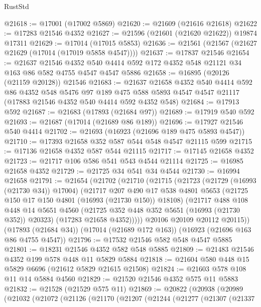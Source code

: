 \begin{lexlean}{RustStd}
\begin{coremodule}
@21618 := @17001 (@17002 @5869)
@21620 := @21609 (@21616 @21618)
@21622 := @17283 @21546 @4352
@21627 := @21596 (@21601 (@21620 @21622)) @19874 @17311
@21629 := @17014 (@17015 @5853)
@21636 := @21561 (@21567 (@21627 @21629 (@17014 (@17019 @5858 @4547))))
@21637 := @17837 @21546
@21654 := @21637
    @21546
    @4352
    @540
    @4414
    @592
    @172
    @4352
    @548
    @21121
    @34
    @163
    @86
    @582
    @4755
    @4547
    @4547
    @5886
@21658 := @16895 (@20126 (@21159 @20128)) @21546
@21683 := @21637
    @21658
    @4352
    @540
    @4414
    @592
    @86
    @4352
    @548
    @5476
    @97
    @189
    @475
    @588
    @5893
    @4547
    @4547
    @21117
    (@17883 @21546 @4352 @540 @4414 @592 @4352 @548)
@21684 := @17913 @592
@21687 := @21683 (@17893 (@21684 @97))
@21689 := @17919 @540 @592
@21693 := @21687 (@17014 (@21689 @86 @189))
@21696 := @17927 @21546 @540 @4414
@21702 := @21693 (@16923 (@21696 @189 @475 @5893 @4547))
@21710 := @17393 @21658 @352 @587 @544 @548 @4547 @21115 @599
@21715 := @17136 @21658 @4352 @587 @544 @21115
@21717 := @17145 @21658 @4352
@21723 := @21717 @106 @586 @541 @543 @4544 @21114
@21725 := @16985 @21658 @4352
@21729 := @21725 @34 @541 @34 @4544
@21730 := @16994 @21658
@21791 := @21654
    (@21702
      (@21710
        (@21715
          (@21723
            (@21729 (@16993 (@21730 @34)) @17004)
            (@21717
              @207
              @490
              @17
              @538
              @4801
              @5653
              (@21725 @150 @17 @150 @4801 (@16993 (@21730 @150)) @18108)
              (@21717
                @488
                @108
                @448
                @14
                @5651
                @4560
                (@21725 @352 @448 @352 @5651 (@16993 (@21730 @352)) @20323)
                (@17283 @21658 @4352)))))
        @20106
        @20109
        @20112
        @20115))
    (@17893 (@21684 @34))
    (@17014 (@21689 @172 @163))
    (@16923 (@21696 @163 @86 @4755 @4547))
@21796 := @17532 @21546 @582 @548 @4547 @5885
@21801 := @18231 @21546 @4352 @582 @548 @5885
@21809 := @21483 @21546 @4352 @199 @578 @448 @11 @5829 @5884
@21818 := @21604 @580 @448 @15 @5829 @6696 (@21612 @5829 @21615 @21508)
@21824 := @21603 @578 @108 @11 @14 @5884 @4560
@21829 := @21520 @21546 @4352 @575 @11 @5883
@21832 := @21528 (@21529 @575 @11)
@21869 := @20822
    (@20938
      (@20989
        (@21032
          (@21072
            (@21126
              (@21170
                (@21207
                  (@21244
                    (@21277
                      (@21307
                        (@21337

\end{coremodule}
\end{lexlean}
